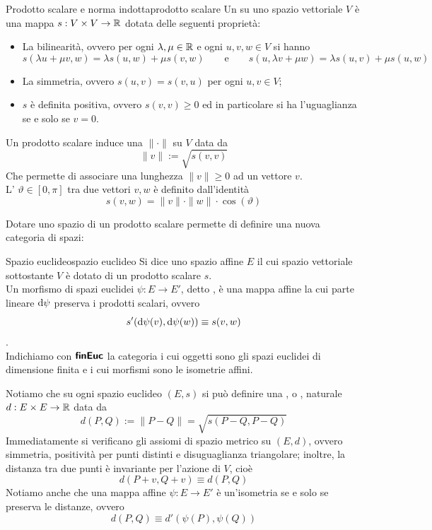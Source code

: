 \documentclass[openany]{book}
\begin{document}
\begin{definition}{Prodotto scalare e norma indotta}{prodotto scalare}
    Un  su uno spazio vettoriale $V$ è una mappa $s:V\times V\to \mathbb{R}$ dotata delle seguenti proprietà:\begin{itemize}
        \item La bilinearità, ovvero per ogni $\lambda,\mu \in \mathbb{R}$ e ogni $u,v,w \in V$ si hanno 
            \[ s(\lambda u + \mu v, w ) = \lambda s(u, w) + \mu s(v, w)\qquad\text{e}\qquad s(u, \lambda v + \mu w) = \lambda s (u,v) + \mu s(u, w)\]
        \item La simmetria, ovvero $s(u,v)=s(v,u)$ per ogni $u,v \in V$;
        \item $s$ è definita positiva, ovvero $s(v,v)\ge 0$ ed in particolare si ha l'uguaglianza se e solo se $v=0$.
    \end{itemize}
    Un prodotto scalare induce una  $\| \cdot \|$ su $V$ data da
    \[ \|v\| := \sqrt{s(v,v)} \]
    Che permette di associare una lunghezza $\|v\|\ge 0$ ad un vettore $v$.\\
    L' $\vartheta \in [0,\pi]$ tra due vettori $v,w$ è definito dall'identità
    \[ s(v,w) = \|v\|\cdot \|w\|\cdot \cos(\vartheta) \]
\end{definition}

Dotare uno spazio di un prodotto scalare permette di definire una nuova categoria di spazi:

\begin{definition}{Spazio euclideo}{spazio euclideo}
    Si dice  uno spazio affine $E$ il cui spazio vettoriale sottostante $V$ è dotato di un prodotto scalare $s$.\\
    Un morfismo di spazi euclidei $\psi:E\to E'$, detto , è una mappa affine la cui parte lineare $\text{d}\psi$ preserva i prodotti scalari, ovvero 
    \[ s'(\text{d}\psi(v),\text{d}\psi(w)) \equiv s(v,w) \].\\
    Indichiamo con $\text{\sffamily\textbf{finEuc}}$ la categoria i cui oggetti sono gli spazi euclidei di dimensione finita e i cui morfismi sono le isometrie affini.
\end{definition}

Notiamo che su ogni spazio euclideo $(E,s)$ si può definire una , o , naturale $d: E\times E\to \mathbb{R}$ data da 
\[ d(P,Q) := \|P-Q\| = \sqrt{ s(P-Q, P-Q) }\]
Immediatamente si verificano gli assiomi di spazio metrico su $(E,d)$, ovvero simmetria, positività per punti distinti e disuguaglianza triangolare; inoltre, la distanza tra due punti è invariante per l'azione di $V$, cioè 
\[d(P+v,Q+v)\equiv d(P,Q)\]
Notiamo anche che una mappa affine $\psi : E\to E'$ è un'isometria se e solo se preserva le distanze, ovvero 
\[d(P,Q) \equiv d'(\psi(P),\psi(Q))\]
\end{document}
